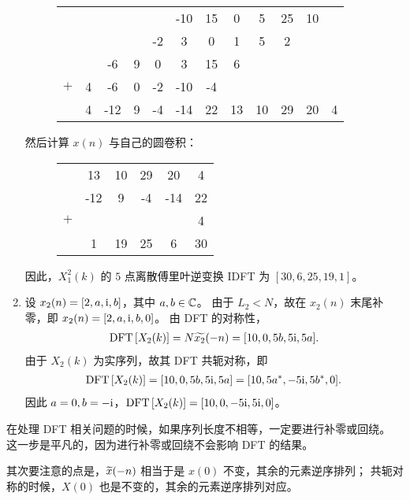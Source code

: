 \begin{solution}
\begin{enumerate}[label=(\arabic*)]
\begin{figure}[H]
\begin{tabular}{c c c c c c c c c c c c}
                    & & & & & -10 & 15 & 0 & 5 & 25 & 10 \\
                    & & & & -2 & 3 & 0 & 1 & 5 & 2 \\
                    & & -6 & 9 & 0 & 3 & 15 & 6 \\
                    $+$ & 4 & -6 & 0 & -2 & -10 & -4 \\
                    \hline
                    & 4 & -12 & 9 & -4 & -14 & 22 & 13 & 10 & 29 & 20 & 4
                \end{tabular}
            \end{figure}
            然后计算 $x(n)$ 与自己的圆卷积：
            \begin{figure}[H]
                \centering
                \begin{tabular}{c c c c c c}
                    & 13 & 10 & 29 & 20 & 4 \\
                    & -12 & 9 & -4 & -14 & 22 \\
                    $+$ & & & & & 4 \\
                    \hline
                    & 1 & 19 & 25 & 6 & 30
                \end{tabular}
            \end{figure}
            因此，$X_1^2(k)$ 的 $5$ 点离散傅里叶逆变换 IDFT 为 $[30, 6, 25, 19, 1]$。
        \item 设 $x_2(n) = [2, a, \mathrm{i}, b]$，其中 $a, b \in \mathbb{C}$。
            由于 $L_2 < N$，故在 $x_2(n)$ 末尾补零，即 $x_2(n) = [2, a, \mathrm{i}, b, 0]$。
            由 DFT 的对称性，
            \begin{align*}
                \mathrm{DFT}\left[X_2(k)\right] = N\widetilde{x_2}(-n) = [10, 0, 5b, 5\mathrm{i}, 5a].
            \end{align*}
            由于 $X_2(k)$ 为实序列，故其 DFT 共轭对称，即
            \begin{align*}
                \mathrm{DFT}\left[X_2(k)\right] = [10, 0, 5b, 5\mathrm{i}, 5a] = [10, 5a^*, -5\mathrm{i}, 5b^*, 0].
            \end{align*}
            因此 $a = 0, b = -\mathrm{i}$，$\mathrm{DFT}\left[X_2(k)\right] = [10, 0, -5\mathrm{i}, 5\mathrm{i}, 0]$。
    \end{enumerate}
\end{solution}

\begin{note}
    在处理 DFT 相关问题的时候，如果序列长度不相等，一定要进行补零或回绕。
    这一步是平凡的，因为进行补零或回绕不会影响 DFT 的结果。

    其次要注意的点是，$\widetilde{x}(-n)$ 相当于是 $x(0)$ 不变，其余的元素逆序排列；
    共轭对称的时候，$X(0)$ 也是不变的，其余的元素逆序排列对应。
\end{note}

